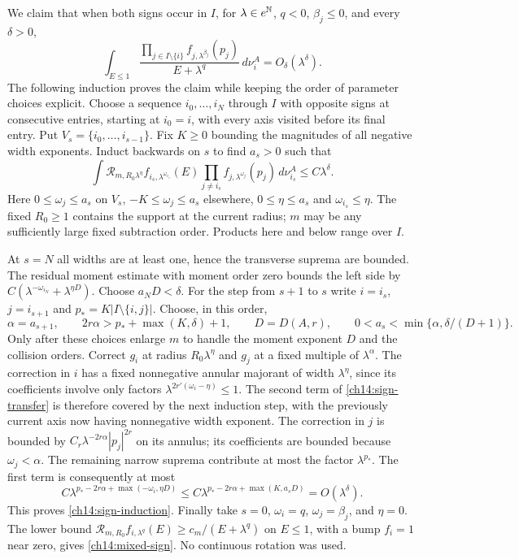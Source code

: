 We claim that when both signs occur in $I$, for $\lambda\in e^{\mathbb N}$,
$q<0$, $\beta_j\le0$, and every $\delta>0$,
\begin{equation}\label{ch14:mixed-sign}
 \int_{E\le1}\frac{\prod_{j\in I\setminus\{i\}}
                         f_{j,\lambda^{\beta_j}}(p_j)}
                        {E+\lambda^q}\,d\nu_i^A
                         =O_\delta(\lambda^\delta).
\end{equation}
The following induction proves the claim while keeping the order of
parameter choices explicit. Choose a sequence $i_0,\ldots,i_N$ through $I$
with opposite signs at consecutive entries, starting at $i_0=i$, with
every axis visited before its final entry. Put
$V_s=\{i_0,\ldots,i_{s-1}\}$. Fix $K\ge0$ bounding the magnitudes of
all negative width exponents. Induct backwards on $s$ to find $a_s>0$
such that
\begin{equation}
 \int\mathcal R_{m,R_0\lambda^\eta}
            f_{i_s,\lambda^{\omega_{i_s}}}(E)
          \prod_{j\ne i_s}f_{j,\lambda^{\omega_j}}(p_j)\,d\nu_{i_s}^A
                       \le C\lambda^\delta.
 \label{ch14:sign-induction}
\end{equation}
Here $0\le\omega_j\le a_s$ on $V_s$,
$-K\le\omega_j\le a_s$ elsewhere,
$0\le\eta\le a_s$ and $\omega_{i_s}\le\eta$.
The fixed $R_0\ge1$ contains the support at the current radius;
$m$ may be any sufficiently large fixed subtraction order.
Products here and below range over $I$.

At $s=N$ all widths are at least one, hence the transverse suprema
are bounded. The residual moment estimate with moment order zero
bounds the left side by $C(\lambda^{-\omega_{i_N}}+\lambda^{\eta D})$.
Choose $a_ND<\delta$. For the step from $s+1$ to $s$ write
$i=i_s$, $j=i_{s+1}$ and $p_*=K|I\setminus\{i,j\}|$.
Choose, in this order,
\[
 \alpha=a_{s+1},\qquad
 2r\alpha>p_*+\max(K,\delta)+1,\qquad
 D=D(A,r),\qquad
 0<a_s<\min\{\alpha,\delta/(D+1)\}.
\]
Only after these choices enlarge $m$ to handle the moment exponent $D$
and the collision orders. Correct $g_i$ at radius $R_0\lambda^\eta$
and $g_j$ at a fixed multiple of $\lambda^\alpha$.
The correction in $i$ has a fixed nonnegative annular majorant of
width $\lambda^\eta$, since its coefficients involve only factors
$\lambda^{2r'(\omega_i-\eta)}\le1$. The second term of
\eqref{ch14:sign-transfer} is therefore covered by the next induction
step, with the previously current axis now having nonnegative width
exponent. The correction in $j$ is bounded by
$C_r\lambda^{-2r\alpha}|p_j|^{2r}$ on its annulus; its coefficients
are bounded because $\omega_j<\alpha$. The remaining narrow suprema
contribute at most the factor $\lambda^{p_*}$. The first term is consequently at most
\[
 C\lambda^{p_*-2r\alpha+
                    \max(-\omega_i,\eta D)}
 \le C\lambda^{p_*-2r\alpha+\max(K,a_sD)}
                  =O(\lambda^\delta).
\]
This proves \eqref{ch14:sign-induction}. Finally take $s=0$,
$\omega_i=q$, $\omega_j=\beta_j$, and $\eta=0$.
The lower bound $\mathcal R_{m,R_0}f_{i,\lambda^q}(E)
\ge c_m/(E+\lambda^q)$ on $E\le1$, with a bump $f_i=1$ near zero,
gives \eqref{ch14:mixed-sign}. No continuous rotation was used.

